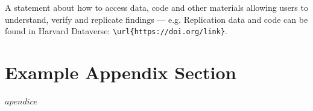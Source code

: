 \documentclass[
  journal=large,
  manuscript=propuesta,
  year=2020,
  volume=37,
]{cup-journal}
\begin{document}
A statement about how to access data, code and other materials allowing users to understand, verify and replicate findings --- e.g. Replication data and code can be found in Harvard Dataverse: \verb+\url{https://doi.org/link}+.



\printendnotes


\appendix

\section{Example Appendix Section}

$apendice$
\end{document}
